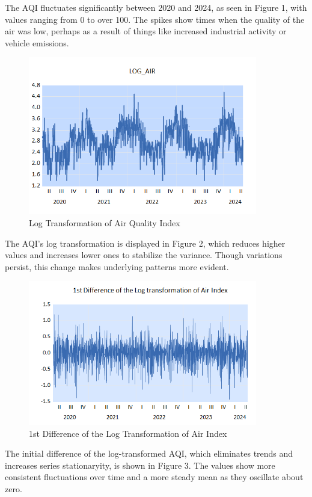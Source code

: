\documentclass{article} %
\begin{document}
The AQI fluctuates significantly between 2020 and 2024, as seen in Figure 1, with values ranging from 0 to over 100. The spikes show times when the quality of the air was low, perhaps as a result of things like increased industrial activity or vehicle emissions.

\begin{figure}[H]
    \centering
    \includegraphics[width=10cm]{images/image20.png}
    \caption{Log Transformation of Air Quality Index}
\end{figure}

The AQI's log transformation is displayed in Figure 2, which reduces higher values and increases lower ones to stabilize the variance. Though variations persist, this change makes underlying patterns more evident.

\begin{figure}[H]
    \centering
    \includegraphics[width=10cm]{images/image36.png}
    \caption{1st Difference of the Log Transformation of Air Index}
\end{figure}

The initial difference of the log-transformed AQI, which eliminates trends and increases series stationaryity, is shown in Figure 3. The values show more consistent fluctuations over time and a more steady mean as they oscillate about zero.
\end{document}

